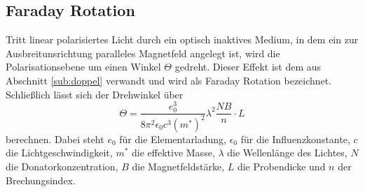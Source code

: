 \subsection{Faraday Rotation}
Tritt linear polarisiertes Licht durch ein optisch inaktives Medium, in dem ein zur Ausbreitunsrichtung paralleles Magnetfeld angelegt ist, wird die Polarisationsebene um einen Winkel $\Theta$ gedreht.
Dieser Effekt ist dem aus Abschnitt \ref{sub:doppel} verwandt und wird als Faraday Rotation bezeichnet.
Schließlich lässt sich der Drehwinkel über
\begin{equation}
    \label{theta}
    \Theta = \frac{e_0^3}{8\pi^2\epsilon_0c^3(m^*)^2}\lambda^2\frac{NB}{n} \cdot L
\end{equation}
berechnen.
Dabei steht $e_0$ für die Elementarladung, $\epsilon_0$ für die Influenzkonstante, $c$ die Lichtgeschwindigkeit,
$m^*$ die effektive Masse, $\lambda$ die Wellenlänge des Lichtes, $N$ die Donatorkonzentration,
$B$ die Magnetfeldstärke, $L$ die Probendicke und $n$ der Brechungsindex.


